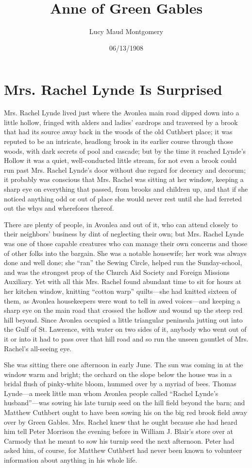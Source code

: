 \documentclass{article}
\title{Anne of Green Gables}
\author{Lucy Maud Montgomery}
\date{06/13/1908}
\begin{document}
\maketitle

\section{Mrs. Rachel Lynde Is Surprised}
Mrs. Rachel Lynde lived just where the Avonlea main road dipped down into a little hollow, fringed with alders and ladies' eardrops and traversed by a brook that had its source away back in the woods of the old Cuthbert place; it was reputed to be an intricate, headlong brook in its earlier course through those woods, with dark secrets of pool and cascade; but by the time it reached Lynde's Hollow it was a quiet, well-conducted little stream, for not even a brook could run past Mrs. Rachel Lynde's door without due regard for decency and decorum; it probably was conscious that Mrs. Rachel was sitting at her window, keeping a sharp eye on everything that passed, from brooks and children up, and that if she noticed anything odd or out of place she would never rest until she had ferreted out the whys and wherefores thereof.

There are plenty of people, in Avonlea and out of it, who can attend closely to their neighbors' business by dint of neglecting their own; but Mrs. Rachel Lynde was one of those capable creatures who can manage their own concerns and those of other folks into the bargain. She was a notable housewife; her work was always done and well done; she ``ran'' the Sewing Circle, helped run the Sunday-school, and was the strongest prop of the Church Aid Society and Foreign Missions Auxiliary. Yet with all this Mrs. Rachel found abundant time to sit for hours at her kitchen window, knitting ``cotton warp'' quilts---she had knitted sixteen of them, as Avonlea housekeepers were wont to tell in awed voices---and keeping a sharp eye on the main road that crossed the hollow and wound up the steep red hill beyond. Since Avonlea occupied a little triangular peninsula jutting out into the Gulf of St. Lawrence, with water on two sides of it, anybody who went out of it or into it had to pass over that hill road and so run the unseen gauntlet of Mrs. Rachel's all-seeing eye.

She was sitting there one afternoon in early June. The sun was coming in at the window warm and bright; the orchard on the slope below the house was in a bridal flush of pinky-white bloom, hummed over by a myriad of bees. Thomas Lynde---a meek little man whom Avonlea people called ``Rachel Lynde's husband''---was sowing his late turnip seed on the hill field beyond the barn; and Matthew Cuthbert ought to have been sowing his on the big red brook field away over by Green Gables. Mrs. Rachel knew that he ought because she had heard him tell Peter Morrison the evening before in William J. Blair's store over at Carmody that he meant to sow his turnip seed the next afternoon. Peter had asked him, of course, for Matthew Cuthbert had never been known to volunteer information about anything in his whole life.
\end{document}
